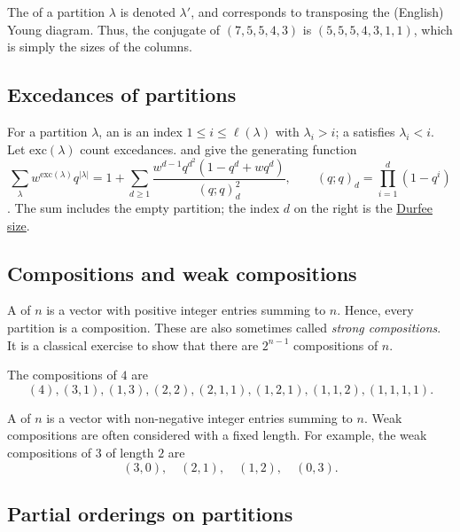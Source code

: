 The \label{conjugatePartition} of a partition $\lambda$ is
denoted $\lambda'$,
and corresponds to transposing the (English) Young diagram.
Thus, the conjugate of $(7,5,5,4,3)$ is $(5,5,5,4,3,1,1)$, which is simply
the sizes of the columns.

\subsection[partitionExcedances]{Excedances of partitions}

For a partition $\lambda$, an  is an index
$1\leq i\leq\ell(\lambda)$ with $\lambda_i>i$; a 
satisfies $\lambda_i<i$. Let $\mathrm{exc}(\lambda)$ count excedances.
 and  give the generating function
\[
 \sum_\lambda w^{\mathrm{exc}(\lambda)}q^{|\lambda|}
 =1+\sum_{d\geq1}
 \frac{w^{d-1}q^{d^2}(1-q^d+wq^d)}{(q;q)_d^2},
 \qquad (q;q)_d=\prod_{i=1}^d(1-q^i)
\]
\cite[Thm.~6]{AndrewsHopkins2026x}. The sum includes the empty partition;
the index $d$ on the right is the \hyperref[durfeeSize]{Durfee size}.

\subsection[compositions]{Compositions and weak compositions}

A \label{compositionDefinition}\label{weakCompositions}
of $n$ is a vector with
positive integer entries summing to $n$.
Hence, every partition is a composition.  These are also sometimes called
\emph{strong compositions}.
It is a classical exercise to show that there are $2^{n-1}$ compositions of $n$.

\begin{example*}[Compositions of 4]
The compositions of $4$ are
\[
(4),
(3,1),
(1,3),
(2,2),
(2,1,1),
(1,2,1),
(1,1,2),
(1,1,1,1).
\]
\end{example*}

A \label{weakCompositionDefinition} of $n$ is a vector
with non-negative integer entries summing to $n$.
Weak compositions are often considered with a fixed length.  For example,
the weak compositions of $3$ of length $2$ are
\[
(3,0),\quad (2,1),\quad (1,2),\quad (0,3).
\]


\subsection[partialOrderingsOnPartitions]{Partial orderings on partitions}\label{dominanceOrder}

